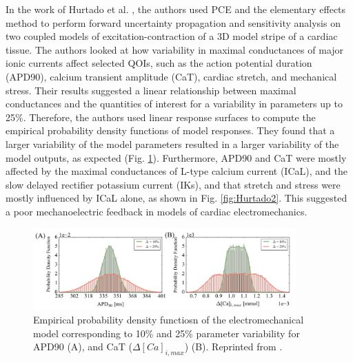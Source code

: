 \documentclass[12pt]{article}
\begin{document}
{\vspace{0.5cm}
In the work of Hurtado et al. \cite{Hurtado}, the authors used PCE and the elementary effects method to perform forward uncertainty propagation and sensitivity analysis on two coupled models of excitation-contraction of a 3D model stripe of a cardiac tissue. The authors looked at how variability in maximal conductances of major ionic currents affect selected QOIs, such as the action potential duration (APD90), calcium transient amplitude (CaT), cardiac stretch, and mechanical stress. 
Their results suggested a linear relationship between maximal conductances and the quantities of interest for a variability in parameters up to 25\%. Therefore, the authors used linear response surfaces to compute the empirical probability density functions of model responses. 
They found that a larger variability of the model parameters resulted in a larger variability of the model outputs, as expected (Fig. \ref{fig:Hurtado1}). Furthermore, APD90 and CaT were mostly affected by the maximal conductances of L-type calcium current (ICaL), and the slow delayed rectifier potassium current (IKs), and that stretch and stress were mostly influenced by ICaL alone, as shown in Fig. \ref{fig:Hurtado2}. This suggested a poor mechanoelectric feedback in models of cardiac electromechanics.



\begin{figure}[h]
	\centering
	\includegraphics[width=0.9\textwidth]{images/Hurtado1.png}
	\caption{ Empirical probability density functiosn of the electromechanical model corresponding to 10\% and 25\% parameter variability for APD90 (A), and CaT ($\Delta[Ca]_{i, max}$) (B). Reprinted from \cite{Hurtado}.}
	\label{fig:Hurtado1}
\end{figure}

}
\end{document}
